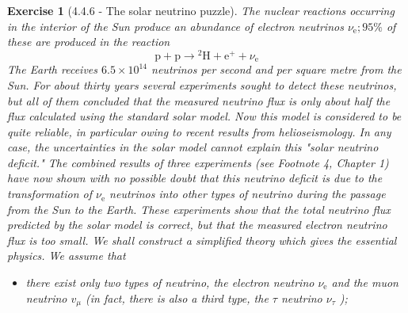 \documentclass[12pt]{article}
\newtheorem{exercise}{Exercise}
\begin{document}
	\begin{exercise}[4.4.6 - The solar neutrino puzzle] \label{ex4.4.6}
		The nuclear reactions occurring in the interior of the Sun produce an abundance of electron neutrinos $\nu_{\mathrm{e}} ; 95 \%$ of these are produced in the reaction
		$$
		\mathrm{p}+\mathrm{p} \rightarrow{ }^{2} \mathrm{H}+\mathrm{e}^{+}+\nu_{\mathrm{e}}
		$$
		The Earth receives $6.5 \times 10^{14}$ neutrinos per second and per square metre from the Sun. For about thirty years several experiments sought to detect these neutrinos, but all of them concluded that the measured neutrino flux is only about half the flux calculated using the standard solar model. Now this model is considered to be quite reliable, in particular owing to recent results from helioseismology. In any case, the uncertainties in the solar model cannot explain this "solar neutrino deficit." The combined results of three experiments (see Footnote 4, Chapter 1) have now shown with no possible doubt that this neutrino deficit is due to the transformation of $\nu_{\mathrm{e}}$ neutrinos into other types of neutrino during the passage from the Sun to the Earth. These experiments show that the total neutrino flux predicted by the solar model is correct, but that the measured electron neutrino flux is too small. We shall construct a simplified theory which gives the essential physics. We assume that
		\begin{itemize}
			\item there exist only two types of neutrino, the electron neutrino $\nu_{\mathrm{e}}$ and the muon neutrino $v_{\mu}$ (in fact, there is also a third type, the $\tau$ neutrino $\nu_{\tau}$ );
		

\end{itemize}
\end{exercise}
\end{document}
